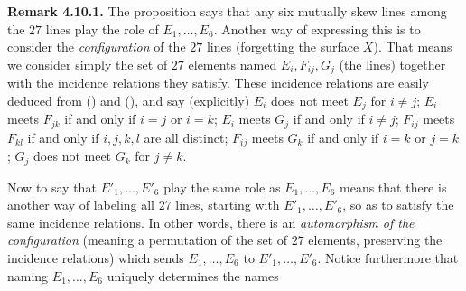 {\medskip
\noindent\hypertarget{result-V-4.10.1}{}\textbf{Remark 4.10.1.} The proposition says that any six mutually skew lines among the $27$ lines play the role of $E_1,\dots,E_6$. Another way of expressing this is to consider the \emph{configuration} of the $27$ lines (forgetting the surface $X$). That means we consider simply the set of $27$ elements named $E_i,F_{ij},G_j$ (the lines) together with the incidence relations they satisfy. These incidence relations are easily deduced from () and (), and say (explicitly) $E_i$ does not meet $E_j$ for $i\ne j$; $E_i$ meets $F_{jk}$ if and only if $i=j$ or $i=k$; $E_i$ meets $G_j$ if and only if $i\ne j$; $F_{ij}$ meets $F_{kl}$ if and only if $i,j,k,l$ are all distinct; $F_{ij}$ meets $G_k$ if and only if $i=k$ or $j=k$; $G_j$ does not meet $G_k$ for $j\ne k$.

Now to say that $E'_1,\dots,E'_6$ play the same role as $E_1,\dots,E_6$ means that there is another way of labeling all $27$ lines, starting with $E'_1,\dots,E'_6$, so as to satisfy the same incidence relations. In other words, there is an \emph{automorphism of the configuration} (meaning a permutation of the set of $27$ elements, preserving the incidence relations) which sends $E_1,\dots,E_6$ to $E'_1,\dots,E'_6$. Notice furthermore that naming $E_1,\dots,E_6$ uniquely determines the names}
